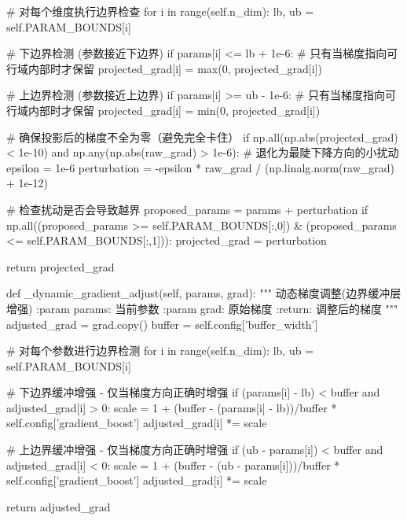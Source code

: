 \documentclass[a4paper,12pt]{article}
\begin{document}
\begin{python}
        # 对每个维度执行边界检查
        for i in range(self.n_dim):
            lb, ub = self.PARAM_BOUNDS[i]
            
            # 下边界检测 (参数接近下边界)
            if params[i] <= lb + 1e-6:
                # 只有当梯度指向可行域内部时才保留
                projected_grad[i] = max(0, projected_grad[i])
            
            # 上边界检测 (参数接近上边界)
            if params[i] >= ub - 1e-6:
                # 只有当梯度指向可行域内部时才保留
                projected_grad[i] = min(0, projected_grad[i])
                
        # 确保投影后的梯度不全为零（避免完全卡住）
        if np.all(np.abs(projected_grad) < 1e-10) and np.any(np.abs(raw_grad) > 1e-6):
            # 退化为最陡下降方向的小扰动
            epsilon = 1e-6
            perturbation = -epsilon * raw_grad / (np.linalg.norm(raw_grad) + 1e-12)
            
            # 检查扰动是否会导致越界
            proposed_params = params + perturbation
            if np.all((proposed_params >= self.PARAM_BOUNDS[:,0]) & 
                      (proposed_params <= self.PARAM_BOUNDS[:,1])):
                projected_grad = perturbation
                
        return projected_grad

    def _dynamic_gradient_adjust(self, params, grad):
        """
        动态梯度调整(边界缓冲层增强)
        :param params: 当前参数
        :param grad: 原始梯度
        :return: 调整后的梯度
        """
        adjusted_grad = grad.copy()
        buffer = self.config['buffer_width']
        
        # 对每个参数进行边界检测
        for i in range(self.n_dim):
            lb, ub = self.PARAM_BOUNDS[i]
            
            # 下边界缓冲增强 - 仅当梯度方向正确时增强
            if (params[i] - lb) < buffer and adjusted_grad[i] > 0:
                scale = 1 + (buffer - (params[i] - lb))/buffer * self.config['gradient_boost']
                adjusted_grad[i] *= scale
                
            # 上边界缓冲增强 - 仅当梯度方向正确时增强
            if (ub - params[i]) < buffer and adjusted_grad[i] < 0:
                scale = 1 + (buffer - (ub - params[i]))/buffer * self.config['gradient_boost']
                adjusted_grad[i] *= scale
                
        return adjusted_grad


\end{python}
\end{document}
